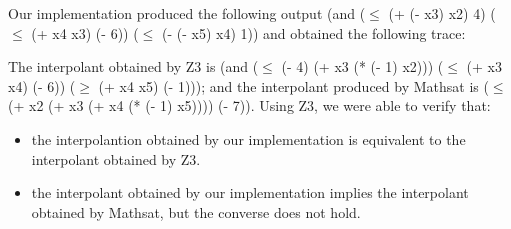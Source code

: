 Our implementation produced the following output
(and
($\leq$ (+ (- x3) x2) 4)
($\leq$ (+ x4 x3) (- 6))
($\leq$ (- (- x5) x4) 1))
and obtained the following trace:



The interpolant obtained by Z3 is 
(and ($\leq$ (- 4) (+ x3 (* (- 1) x2))) ($\leq$ (+ x3 x4) (- 6)) ($\geq$ (+ x4 x5) (- 1))); 
and the interpolant produced by Mathsat is ($\leq$ (+ x2 (+ x3 (+ x4 (* (- 1) x5)))) (- 7)).
Using Z3, we were able to verify that: 
\begin{itemize}
  \item the interpolantion obtained by our implementation
    is equivalent to the interpolant obtained by Z3. 
  \item the interpolant obtained by our implementation implies the interpolant
    obtained by Mathsat, but the converse does not hold.
\end{itemize}







